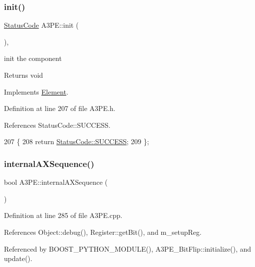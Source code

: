 \subsubsection{\texorpdfstring{init()}{init()}}
{\footnotesize\ttfamily \hyperlink{classStatusCode}{Status\+Code} A3\+P\+E\+::init (\begin{DoxyParamCaption}{ }\end{DoxyParamCaption})\hspace{0.3cm}{\ttfamily [inline]}, {\ttfamily [virtual]}}

init the component

\begin{DoxyReturn}{Returns}
void 
\end{DoxyReturn}


Implements \hyperlink{classElement_af42754b5cabc198869222725218d695c}{Element}.



Definition at line 207 of file A3\+P\+E.\+h.



References Status\+Code\+::\+S\+U\+C\+C\+E\+SS.


\begin{DoxyCode}
207                     \{
208     \textcolor{keywordflow}{return} \hyperlink{classStatusCode_a6f565cbeadc76d14c72f047e5e85eb4badd0da38d3ba0d922efd1f4619bc37ad8}{StatusCode::SUCCESS};
209   \};
\end{DoxyCode}
\mbox{\label{classA3PE_a4b9cf42bdd0a14e48807faa0956c59bd}} 
\subsubsection{\texorpdfstring{internal\+A\+X\+Sequence()}{internalAXSequence()}}
{\footnotesize\ttfamily bool A3\+P\+E\+::internal\+A\+X\+Sequence (\begin{DoxyParamCaption}{ }\end{DoxyParamCaption})}



Definition at line 285 of file A3\+P\+E.\+cpp.



References Object\+::debug(), Register\+::get\+Bit(), and m\+\_\+setup\+Reg.



Referenced by B\+O\+O\+S\+T\+\_\+\+P\+Y\+T\+H\+O\+N\+\_\+\+M\+O\+D\+U\+L\+E(), A3\+P\+E\+\_\+\+Bit\+Flip\+::initialize(), and update().


